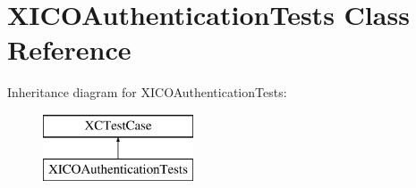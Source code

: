 \hypertarget{interface_x_i_c_o_authentication_tests}{}\section{X\+I\+C\+O\+Authentication\+Tests Class Reference}
\label{interface_x_i_c_o_authentication_tests}
Inheritance diagram for X\+I\+C\+O\+Authentication\+Tests\+:\begin{figure}[H]
\begin{center}
\leavevmode
\includegraphics[height=2.000000cm]{interface_x_i_c_o_authentication_tests}
\end{center}
\end{figure}
